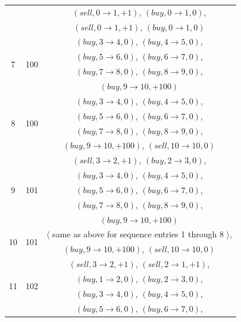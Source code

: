\begin{answer}
\begin{table}[h!]
\begin{center}
\begin{tabular}{c|c|c}
							  & & $(sell, 0 \rightarrow 1, +1)$, $(buy, 0 \rightarrow 1, 0)$, \\
							  & & $(sell, 0 \rightarrow 1, +1)$, $(buy, 0 \rightarrow 1, 0)$ \\
	  \hline
  	  \multirow{4}{*}{7} & \multirow{4}{*}{100} & $(buy, 3 \rightarrow 4, 0)$, $(buy, 4 \rightarrow 5, 0)$, \\
	  						  & & $(buy, 5 \rightarrow 6, 0)$, $(buy, 6 \rightarrow 7, 0)$, \\
							  & & $(buy, 7 \rightarrow 8, 0)$, $(buy, 8 \rightarrow 9, 0)$, \\
							  & & $(buy, 9 \rightarrow 10, +100)$ \\
	  \hline
  	  \multirow{4}{*}{8} & \multirow{4}{*}{100} & $(buy, 3 \rightarrow 4, 0)$, $(buy, 4 \rightarrow 5, 0)$, \\
	  						  & & $(buy, 5 \rightarrow 6, 0)$, $(buy, 6 \rightarrow 7, 0)$, \\
							  & & $(buy, 7 \rightarrow 8, 0)$, $(buy, 8 \rightarrow 9, 0)$, \\
							  & & $(buy, 9 \rightarrow 10, +100)$, $(sell, 10 \rightarrow 10, 0)$ \\
	  \hline
  	  \multirow{5}{*}{9} & \multirow{5}{*}{101} & $(sell, 3 \rightarrow 2, +1)$, $(buy, 2 \rightarrow 3, 0)$, \\
  							  & & $(buy, 3 \rightarrow 4, 0)$, $(buy, 4 \rightarrow 5, 0)$, \\
							  & & $(buy, 5 \rightarrow 6, 0)$, $(buy, 6 \rightarrow 7, 0)$, \\
							  & & $(buy, 7 \rightarrow 8, 0)$, $(buy, 8 \rightarrow 9, 0)$, \\
							  & & $(buy, 9 \rightarrow 10, +100)$ \\
	  \hline
  	  \multirow{2}{*}{10} & \multirow{2}{*}{101} & $\langle$ same as above for sequence entries 1 through 8 $\rangle$, \\
	   						  & & $(buy, 9 \rightarrow 10, +100)$, $(sell, 10 \rightarrow 10, 0)$ \\
	  \hline
  	  \multirow{6}{*}{11} & \multirow{6}{*}{102} & $(sell, 3 \rightarrow 2, +1)$, $(sell, 2 \rightarrow 1, +1)$, \\
	   						  & & $(buy, 1 \rightarrow 2, 0)$, $(buy, 2 \rightarrow 3, 0)$, \\ 
							  & & $(buy, 3 \rightarrow 4, 0)$, $(buy, 4 \rightarrow 5, 0)$, \\
							  & & $(buy, 5 \rightarrow 6, 0)$, $(buy, 6 \rightarrow 7, 0)$, \\

\end{tabular}
\end{center}
\end{table}
\end{answer}
